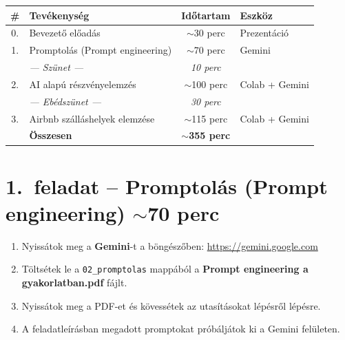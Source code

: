 \documentclass[11pt,a4paper]{article}
\newcommand{\taskbox}[2]{%
  \begin{tcolorbox}[taskstyle, title=#1]
  #2
  \end{tcolorbox}\vspace{4pt}}
\begin{document}
\begingroup
\renewcommand{\arraystretch}{1.35}
\begin{center}
\begin{tabularx}{\textwidth}{c X c l}
  \toprule
  \rowcolor{headerbg}
  \textcolor{headertext}{\textbf{\#}} &
  \textcolor{headertext}{\textbf{Tevékenység}} &
  \textcolor{headertext}{\textbf{Időtartam}} &
  \textcolor{headertext}{\textbf{Eszköz}} \\
  \midrule
  0. & Bevezető előadás & $\sim$30 perc & Prezentáció \\
  \rowcolor{rowalt}
  1. & Promptolás (Prompt engineering) & $\sim$70 perc & Gemini \\
  \rowcolor{breakrow}
     & \textit{--- Szünet ---} & \textit{10 perc} & \\
  2. & AI alapú részvényelemzés & $\sim$100 perc & Colab + Gemini \\
  \rowcolor{breakrow}
     & \textit{--- Ebédszünet ---} & \textit{30 perc} & \\
  \rowcolor{rowalt}
  3. & Airbnb szálláshelyek elemzése & $\sim$115 perc & Colab + Gemini \\
  \midrule
  \rowcolor{headerbg}
     & \textcolor{headertext}{\textbf{Összesen}} & \textcolor{headertext}{\textbf{$\sim$355 perc}} & \\
  \bottomrule
\end{tabularx}
\end{center}
\endgroup

\section{1.\ feladat -- Promptolás (Prompt engineering) \hfill {\normalsize\color{medgray}$\sim$70 perc}}

\taskbox{Teendők}{
\begin{enumerate}[leftmargin=1.5em]
  \item Nyissátok meg a \textbf{Gemini}-t a böngészőben: \url{https://gemini.google.com}
  \item Töltsétek le a \texttt{02\_promptolas} mappából a \textbf{Prompt engineering a gyakorlatban.pdf} fájlt.
  \item Nyissátok meg a PDF-et és kövessétek az utasításokat lépésről lépésre.
  \item A feladatleírásban megadott promptokat próbáljátok ki a Gemini felületen.
\end{enumerate}
}
\end{document}
